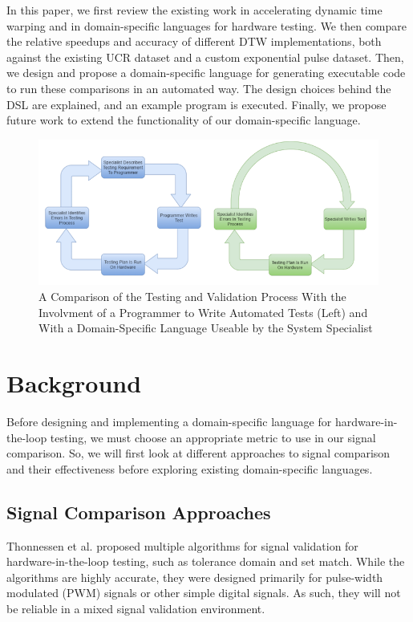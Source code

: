 \documentclass[sigconf,authordraft]{acmart}
\begin{document}
In this paper, we first review the existing work in accelerating dynamic time warping and in domain-specific languages for hardware testing. We then compare the relative speedups and accuracy of different DTW implementations, both against the existing UCR dataset \cite{SIG:UCRArchive2018} and a custom exponential pulse dataset. Then, we design and propose a domain-specific language for generating executable code to run these comparisons in an automated way. The design choices behind the DSL are explained, and an example program is executed. Finally, we propose future work to extend the functionality of our domain-specific language.

\begin{figure}
    \centering
    \includegraphics[width=0.8\linewidth]{img/old_process.png}
    \caption{A Comparison of the Testing and Validation Process With the Involvment of a Programmer to Write Automated Tests (Left) and With a Domain-Specific Language Useable by the System Specialist}
    \label{fig:proc1}
\end{figure}


\section{Background}

Before designing and implementing a domain-specific language for hardware-in-the-loop testing, we must choose an appropriate metric to use in our signal comparison. So, we will first look at different approaches to signal comparison and their effectiveness before exploring existing domain-specific languages.

\subsection{Signal Comparison Approaches}

Thonnessen et al. \cite{SIG:HilPLC} proposed multiple algorithms for signal validation for hardware-in-the-loop testing, such as tolerance domain and set match. While the algorithms are highly accurate, they were designed primarily for pulse-width modulated (PWM) signals or other simple digital signals. As such, they will not be reliable in a mixed signal validation environment.
\end{document}
